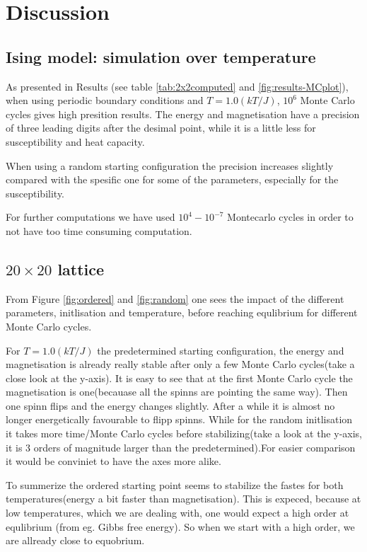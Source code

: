 \documentclass[../main.tex]{subfiles}
\begin{document}
\section{Discussion}

\subsection{Ising model: simulation over temperature}

As presented in Results (see table \ref{tab:2x2computed} and \ref{fig:results-MCplot}), when using periodic boundary conditions and $T = 1.0(kT/J)$, $10^6$ Monte Carlo cycles gives high presition results. The energy and magnetisation have a precision of three leading digits after the desimal point, while it is a little less for susceptibility and heat capacity.

When using a random starting configuration the precision increases slightly compared with the spesific one for some of the parameters, especially for the susceptibility.

For further computations we have used $10^4 - 10^{-7}$ Montecarlo cycles in order to not have too time consuming computation.

\subsection{$20 \times 20$ lattice}

From Figure \ref{fig:ordered} and \ref{fig:random} one sees the impact of the different parameters, initlisation and temperature, before reaching equlibrium for different Monte Carlo cycles.

For $T=1.0(kT/J)$ the predetermined starting configuration, the energy and magnetisation is already really stable after only a few Monte Carlo cycles(take a close look at the y-axis). It is easy to see that at the first Monte Carlo cycle the magnetisation is one(becauase all the spinns are pointing the same way). Then one spinn flips and the energy changes slightly. After a while it is almost no longer energetically favourable to flipp spinns.
While for the random initlisation it takes more time/Monte Carlo cycles before stabilizing(take a look at the y-axis, it is 3 orders of magnitude larger than the predetermined).For easier comparison it would be conviniet to have the axes more alike.

To summerize the ordered starting point seems to stabilize the fastes for both temperatures(energy a bit faster than magnetisation). This is expeced, because at low temperatures, which we are dealing with, one would expect a high order at equlibrium (from eg. Gibbs free energy). So when we start with a high order, we are allready close to equobrium.
\end{document}
